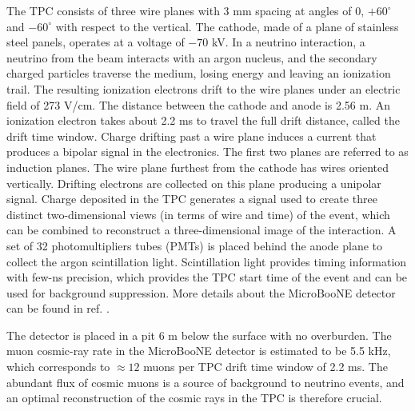 \documentclass[a4paper,11pt]{article}
\begin{document}
The TPC consists of three wire planes with 3 mm spacing at angles of 0,  $+60^{\circ}$ and  $-60^{\circ}$ with respect to the vertical. The cathode, made of a plane of stainless steel panels, operates at a voltage of $-70$ kV. In a neutrino interaction, a neutrino from the beam interacts with an argon nucleus, and the secondary charged particles traverse the medium, losing energy and leaving an ionization trail. The resulting ionization electrons drift to the wire planes under an electric field of 273 V/cm. The distance between the cathode and anode is 2.56 m. An ionization electron takes about 2.2 ms to travel the full drift distance, called the drift time window. Charge drifting past a wire plane induces a current that produces a bipolar signal in the electronics. The first two planes are referred to as induction planes. The wire plane furthest from the cathode has wires oriented vertically. Drifting electrons are collected on this plane producing a unipolar signal. Charge deposited in the TPC generates a signal used to create three distinct two-dimensional views (in terms of wire and time) of the event, which can be combined to reconstruct a three-dimensional image of the interaction.
A set of 32 photomultipliers tubes (PMTs) is placed behind the anode plane to collect the argon scintillation light. Scintillation light provides timing information with few-ns precision, which provides the TPC start time of the event and can be used for background suppression. More details about the MicroBooNE detector can be found in ref. \cite{detector}.

The detector is placed in a pit 6 m below the surface with no overburden. The muon cosmic-ray rate in the MicroBooNE detector is estimated to be 5.5 kHz, which corresponds to $\approx12$ muons per TPC drift time window of 2.2 ms. The abundant flux of cosmic muons is a source of background to neutrino events, and an optimal reconstruction of the cosmic rays in the TPC is therefore crucial.
\end{document}
